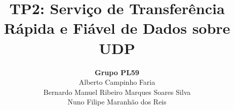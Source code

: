 \documentclass{llncs}
\begin{document}
\mainmatter

\title{TP2: Serviço de Transferência Rápida e Fiável de Dados sobre UDP}

\author{
    {\bfseries Grupo PL59} \\
    Alberto Campinho Faria \\
    Bernardo Manuel Ribeiro Marques Soares Silva \\
    Nuno Filipe Maranhão dos Reis
    }


\date{}

\maketitle

\begin{abstract}

\end{abstract}





\end{document}
